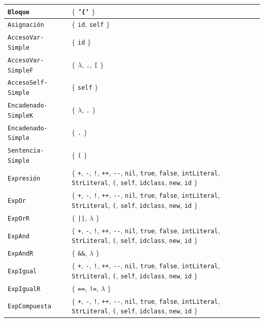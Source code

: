 \begin{longtable}{|
>{\raggedright\arraybackslash}p{}|
>{\raggedright\arraybackslash}p{}|}
\texttt{Bloque} & \(\{\) \texttt{'\{'} \(\}\) \\ \hline
\texttt{Asignación} & \(\{\) \texttt{id}, \texttt{self} \(\}\) \\ \hline
\texttt{AccesoVar-Simple} & \(\{\) \texttt{id} \(\}\) \\ \hline
\texttt{AccesoVar-SimpleF} & \(\{\) \(\lambda\), \texttt{.}, \texttt{[} \(\}\) \\ \hline
\texttt{AccesoSelf-Simple} & \(\{\) \texttt{self} \(\}\) \\ \hline
\texttt{Encadenado-SimpleK} & \(\{\) \(\lambda\), \texttt{.} \(\}\) \\ \hline
\texttt{Encadenado-Simple} & \(\{\) \texttt{.} \(\}\) \\ \hline
\texttt{Sentencia-Simple} & \(\{\) \texttt{(} \(\}\) \\ \hline
\texttt{Expresión} & \(\{\) \texttt{+}, \texttt{-}, \texttt{!}, \texttt{++}, \texttt{-{}-}, \texttt{nil}, \texttt{true}, \texttt{false}, \texttt{intLiteral}, \texttt{StrLiteral}, \texttt{(}, \texttt{self}, \texttt{idclass}, \texttt{new}, \texttt{id} \(\}\) \\ \hline
\texttt{ExpOr} & \(\{\) \texttt{+}, \texttt{-}, \texttt{!}, \texttt{++}, \texttt{-{}-}, \texttt{nil}, \texttt{true}, \texttt{false}, \texttt{intLiteral}, \texttt{StrLiteral}, \texttt{(}, \texttt{self}, \texttt{idclass}, \texttt{new}, \texttt{id} \(\}\) \\ \hline
\texttt{ExpOrR} & \(\{\) \texttt{||}, \(\lambda\) \(\}\) \\ \hline
\texttt{ExpAnd} & \(\{\) \texttt{+}, \texttt{-}, \texttt{!}, \texttt{++}, \texttt{-{}-}, \texttt{nil}, \texttt{true}, \texttt{false}, \texttt{intLiteral}, \texttt{StrLiteral}, \texttt{(}, \texttt{self}, \texttt{idclass}, \texttt{new}, \texttt{id} \(\}\) \\ \hline
\texttt{ExpAndR} & \(\{\) \texttt{\&\&}, \(\lambda\) \(\}\) \\ \hline
\texttt{ExpIgual} & \(\{\) \texttt{+}, \texttt{-}, \texttt{!}, \texttt{++}, \texttt{-{}-}, \texttt{nil}, \texttt{true}, \texttt{false}, \texttt{intLiteral}, \texttt{StrLiteral}, \texttt{(}, \texttt{self}, \texttt{idclass}, \texttt{new}, \texttt{id} \(\}\) \\ \hline
\texttt{ExpIgualR} & \(\{\) \texttt{==}, \texttt{!=}, \(\lambda\) \(\}\) \\ \hline
\texttt{ExpCompuesta} & \(\{\) \texttt{+}, \texttt{-}, \texttt{!}, \texttt{++}, \texttt{-{}-}, \texttt{nil}, \texttt{true}, \texttt{false}, \texttt{intLiteral}, \texttt{StrLiteral}, \texttt{(}, \texttt{self}, \texttt{idclass}, \texttt{new}, \texttt{id} \(\}\) \\ \hline

\end{longtable}
